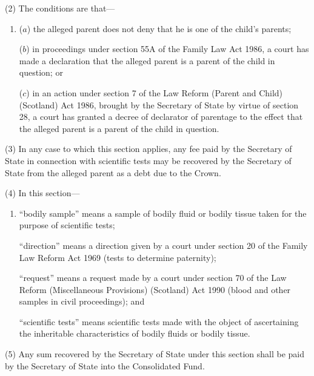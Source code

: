 \documentclass[a4paper]{article}
\begin{document}
(2) The conditions are that---
\begin{enumerate}\item[]
($a$)
the alleged parent does not deny that he is one of the child’s parents;

($b$)
in proceedings under section 55A of the Family Law Act 1986, a court has made a declaration that the alleged parent is a parent of the child in question;
or

($c$)
in an action under section 7 of the Law Reform (Parent and Child) (Scotland) Act 1986, brought by the Secretary of State by virtue of section 28, a court has granted a decree of declarator of parentage to the effect that the alleged parent is a parent of the child in question.
\end{enumerate}

(3) In any case to which this section applies, any fee paid by the Secretary of State in connection with scientific tests may be recovered by the Secretary of State from the alleged parent as a debt due to the Crown.

(4) In this section---
\begin{enumerate}\item[]
 “bodily sample” means a sample of bodily fluid or bodily tissue taken for the purpose of scientific tests; 

“direction” means a direction given by a court under section 20 of the Family Law Reform Act 1969 (tests to determine paternity); 

“request” means a request made by a court under section 70 of the Law Reform (Miscellaneous Provisions) (Scotland) Act 1990 (blood and other samples in civil proceedings); and 

“scientific tests” means scientific tests made with the object of ascertaining the inheritable characteristics of bodily fluids or bodily tissue.
\end{enumerate}

(5) Any sum recovered by the Secretary of State under this section shall be paid by the Secretary of State into the Consolidated Fund.
\end{document}
